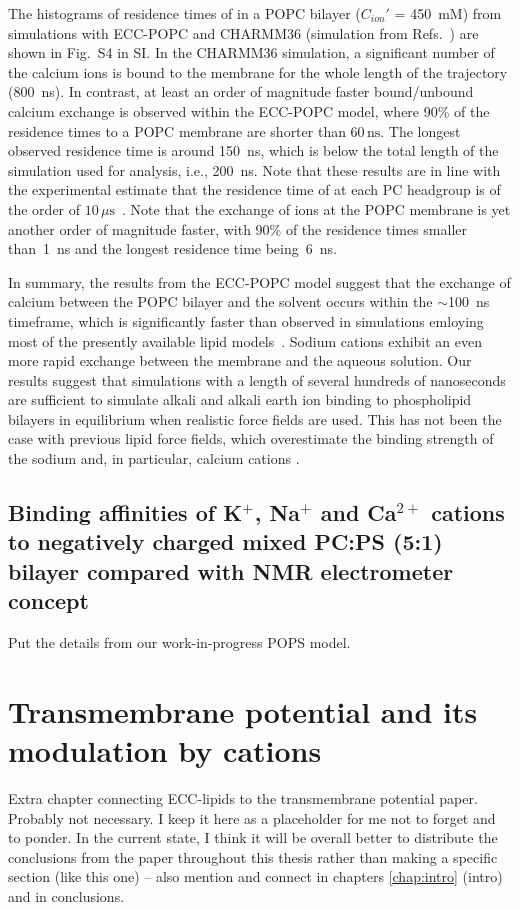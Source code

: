 The histograms of residence times of  in a POPC bilayer ($C_{ion}'$ = 450~mM) from simulations with  
ECC-POPC and CHARMM36 (simulation from Refs.~\citep{javanainen17,zenodo.259376}) are shown in Fig.~S4 in SI. 
In the CHARMM36 simulation, a significant number of the calcium ions is bound to the membrane for the whole length of the trajectory (800~ns). 
In contrast, at least an order of magnitude faster bound/unbound calcium exchange is observed within the ECC-POPC model, 
where 90\% of the  residence times to a POPC membrane are shorter than $60\,\mathrm{ns}$. The longest observed 
residence time is around 150~ns, which is below the total length of the simulation used for analysis, i.e., 200~ns. 
Note that these results are in line with the experimental estimate that the residence time of  at each PC 
headgroup is of the order of $10\,\mu\mathrm{s}$~\citep{altenbach84}. Note that the exchange of  ions at the POPC membrane 
is yet another order of magnitude faster, with 90\% of the residence times smaller than~1~ns and the longest residence time being~6~ns. 
 
In summary, the results from the ECC-POPC model suggest that the exchange of calcium between the POPC bilayer and the solvent occurs within the $\sim$100~ns timeframe, which is significantly faster than observed in simulations emloying most of the presently available lipid models~\citep{javanainen17}. Sodium cations exhibit an even more rapid exchange between the membrane and the aqueous solution. Our results suggest that simulations with a length of several hundreds of nanoseconds are sufficient to simulate alkali and alkali earth ion binding to phospholipid bilayers in equilibrium when realistic force fields are used. This has not been the case with previous lipid force fields, which overestimate the binding strength of the sodium and, in particular,  calcium cations \citep{javanainen17, catte16}. 
 
 





\subsection{Binding affinities of K$^+$, Na$^+$ and Ca$^{2+}$ cations to negatively charged mixed PC:PS (5:1) bilayer compared with NMR electrometer concept} 

Put the details from our work-in-progress POPS model. 




\section{Transmembrane potential and its modulation by cations}

Extra chapter connecting ECC-lipids to the transmembrane potential paper.
Probably not necessary.
I keep it here as a placeholder for me not to forget and to ponder.
In the current state, I think it will be overall better to distribute the conclusions from the paper throughout this thesis rather than making a specific section (like this one) -- also mention and connect in chapters \ref{chap:intro} (intro) and in conclusions. 

